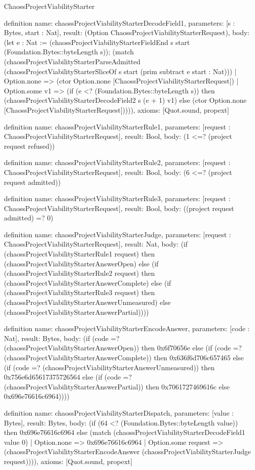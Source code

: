 \begin{lexlean}{ChaossProjectViabilityStarter}
\begin{semanticmodule}
definition{
  name: chaossProjectViabilityStarterDecodeField1,
  parameters: [s : Bytes, start : Nat],
  result: (Option ChaossProjectViabilityStarterRequest),
  body: (let e : Nat := (chaossProjectViabilityStarterFieldEnd s start (Foundation.Bytes::byteLength s)); (match (chaossProjectViabilityStarterParseAdmitted (chaossProjectViabilityStarterSliceOf s start (prim subtract e start : Nat)))
    | Option.none => (ctor Option.none [ChaossProjectViabilityStarterRequest])
    | Option.some v1 => (if (e <? (Foundation.Bytes::byteLength s)) then (chaossProjectViabilityStarterDecodeField2 s (e + 1) v1) else (ctor Option.none [ChaossProjectViabilityStarterRequest])))),
  axioms: [Quot.sound, propext]
}

definition{
  name: chaossProjectViabilityStarterRule1,
  parameters: [request : ChaossProjectViabilityStarterRequest],
  result: Bool,
  body: (1 <=? (project request refused))
}

definition{
  name: chaossProjectViabilityStarterRule2,
  parameters: [request : ChaossProjectViabilityStarterRequest],
  result: Bool,
  body: (6 <=? (project request admitted))
}

definition{
  name: chaossProjectViabilityStarterRule3,
  parameters: [request : ChaossProjectViabilityStarterRequest],
  result: Bool,
  body: ((project request admitted) =? 0)
}

definition{
  name: chaossProjectViabilityStarterJudge,
  parameters: [request : ChaossProjectViabilityStarterRequest],
  result: Nat,
  body: (if (chaossProjectViabilityStarterRule1 request) then (chaossProjectViabilityStarterAnswerOpen) else (if (chaossProjectViabilityStarterRule2 request) then (chaossProjectViabilityStarterAnswerComplete) else (if (chaossProjectViabilityStarterRule3 request) then (chaossProjectViabilityStarterAnswerUnmeasured) else (chaossProjectViabilityStarterAnswerPartial))))
}

definition{
  name: chaossProjectViabilityStarterEncodeAnswer,
  parameters: [code : Nat],
  result: Bytes,
  body: (if (code =? (chaossProjectViabilityStarterAnswerOpen)) then 0x6f70656e else (if (code =? (chaossProjectViabilityStarterAnswerComplete)) then 0x636f6d706c657465 else (if (code =? (chaossProjectViabilityStarterAnswerUnmeasured)) then 0x756e6d65617375726564 else (if (code =? (chaossProjectViabilityStarterAnswerPartial)) then 0x7061727469616c else 0x696e76616c6964))))
}

definition{
  name: chaossProjectViabilityStarterDispatch,
  parameters: [value : Bytes],
  result: Bytes,
  body: (if (64 <? (Foundation.Bytes::byteLength value)) then 0x696e76616c6964 else (match (chaossProjectViabilityStarterDecodeField1 value 0)
    | Option.none => 0x696e76616c6964
    | Option.some request => (chaossProjectViabilityStarterEncodeAnswer (chaossProjectViabilityStarterJudge request)))),
  axioms: [Quot.sound, propext]
}
\end{semanticmodule}
\end{lexlean}
